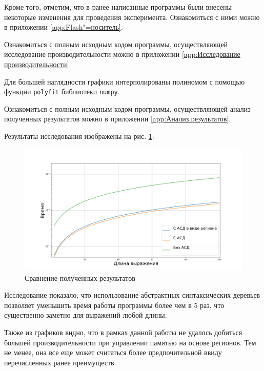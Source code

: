 \documentclass[referat]{SCWorks}
\begin{document}
\inputminted[fontsize=\small, breaklines=true, style=bw, linenos]{python3}{test.py}

Кроме того, отметим, что в ранее написанные программы были внесены некоторые изменения для проведения эксперимента. Ознакомиться с ними можно в приложении \ref{app:Flash"=носитель}.

Ознакомиться с полным исходным кодом программы, осуществляющей исследование производительности можно в приложении \ref{app:Исследование производительности}.

Для большей наглядности графики интерполированы полиномом с помощью функции \verb|polyfit| библиотеки \verb|numpy|.

Ознакомиться с полным исходным кодом программы, осуществляющей анализ полученных результатов можно в приложении \ref{app:Анализ результатов}.

Результаты исследования изображены на рис. \ref{fig:Сравнение полученных результатов}:
\begin{figure}[H]
    \centering
    \includegraphics[scale=0.5]{benchmark.png}
    \caption{Сравнение полученных результатов}
    \label{fig:Сравнение полученных результатов}
\end{figure}

Исследование показало, что использование абстрактных синтаксических деревьев позволяет уменьшить время работы программы более чем в $5$ раз, что существенно заметно для выражений любой длины.

Также из графиков видно, что в рамках данной работы не удалось добиться большей производительности при управлении памятью на основе регионов. Тем не менее, она все еще может считаться более предпочительной ввиду перечисленных ранее преимуществ.
\end{document}
